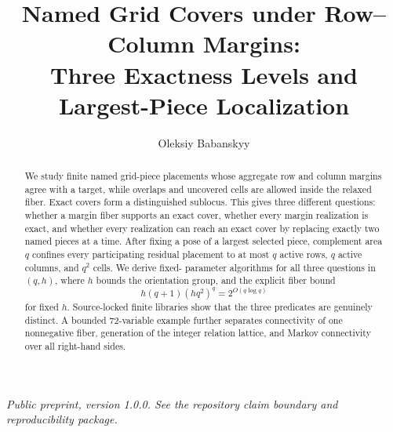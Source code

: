 \documentclass[11pt]{article}
\title{Named Grid Covers under Row--Column Margins:\\
Three Exactness Levels and Largest-Piece Localization}
\author{Oleksiy Babanskyy}
\date{}
\begin{document}
\maketitle

\begin{abstract}
We study finite named grid-piece placements whose aggregate row and column
margins agree with a target, while overlaps and uncovered cells are allowed
inside the relaxed fiber.  Exact covers form a distinguished sublocus.  This
gives three different questions: whether a margin fiber supports an exact
cover, whether every margin realization is exact, and whether every
realization can reach an exact cover by replacing exactly two named pieces
at a time.  After fixing a pose of a largest selected piece, complement area
\(q\) confines every participating residual placement to at most \(q\)
active rows, \(q\) active columns, and \(q^2\) cells.  We derive fixed-
parameter algorithms for all three questions in \((q,h)\), where \(h\) bounds
the orientation group, and the explicit fiber bound
\[
  h(q+1)(h q^2)^q=2^{O(q\log q)}
\]
for fixed \(h\).  Source-locked finite libraries show that the three
predicates are genuinely distinct.  A bounded 72-variable example further
separates connectivity of one nonnegative fiber, generation of the integer
relation lattice, and Markov connectivity over all right-hand sides.
\end{abstract}

\begin{center}
\small\emph{Public preprint, version 1.0.0. See the repository claim boundary and reproducibility package.}
\end{center}

\tableofcontents










\appendix



\end{document}
